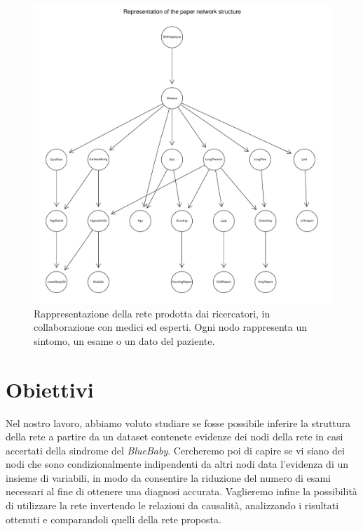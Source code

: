  \begin{figure}
 	\centering
 	\includegraphics[width=1\linewidth]{images/paper_structure}
 	\caption{Rappresentazione della rete prodotta dai ricercatori, in collaborazione con medici ed esperti. Ogni nodo rappresenta un sintomo, un esame o un dato del paziente.}
 	\label{fig:paperstructure}
 \end{figure}

\section{Obiettivi}
Nel nostro lavoro, abbiamo voluto studiare se fosse possibile inferire la struttura della rete a partire da un dataset contenete evidenze dei nodi della rete in casi accertati della sindrome del \textit{BlueBaby}. Cercheremo poi di capire se vi siano dei nodi che sono condizionalmente indipendenti da altri nodi data l'evidenza di un insieme di variabili, in modo da consentire la riduzione del numero di esami necessari al fine di ottenere una diagnosi accurata. Vaglieremo infine la possibilità di utilizzare la rete invertendo le relazioni da causalità, analizzando i risultati ottenuti e comparandoli quelli della rete proposta.